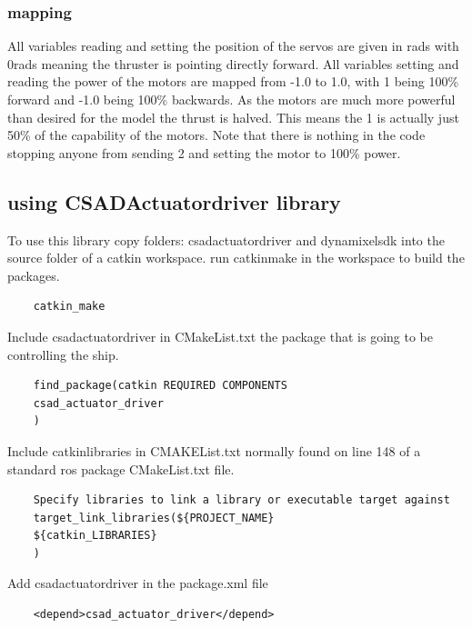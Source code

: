 \subsubsection{mapping}

All variables reading and setting the position of the servos are given in rads with 0rads meaning the thruster is pointing directly forward.
All variables setting and reading the power of the motors are mapped from -1.0 to 1.0, with 1 being 100\% forward and -1.0 being 100\% backwards. As the motors are much more powerful than desired for the model the thrust is halved. This means the 1 is actually just 50\% of the capability of the motors. Note that there is nothing in the code stopping anyone from sending 2 and setting the motor to 100\% power.

\subsection{using CSAD\textunderscore Actuator\textunderscore driver library}

To use this library copy folders: csad\textunderscore actuator\textunderscore driver and  dynamixel\textunderscore sdk into the source folder of a catkin workspace. run catkin\textunderscore make in the workspace to build the packages.

\begin{verbatim}
    catkin_make
\end{verbatim}

\noindent Include csad\textunderscore actuator\textunderscore driver in CMakeList.txt the package that is going to be controlling the ship.

\begin{verbatim}
    find_package(catkin REQUIRED COMPONENTS
    csad_actuator_driver
    )
\end{verbatim}

\noindent Include catkin\textunderscore libraries in CMAKEList.txt normally found on line 148 of a standard ros package CMakeList.txt file.

\begin{verbatim}
    Specify libraries to link a library or executable target against
    target_link_libraries(${PROJECT_NAME}
    ${catkin_LIBRARIES}
    )
\end{verbatim}

\noindent Add csad\textunderscore actuator\textunderscore driver in the package.xml file

\begin{verbatim}
    <depend>csad_actuator_driver</depend>
\end{verbatim}

